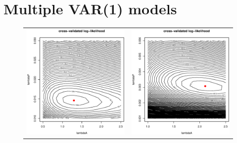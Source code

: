 \section{Multiple VAR(1) models}
\begin{figure}[h!]
\centering
\begin{tabular}{cc}
\includegraphics[scale=0.35]{Figure_9a.eps} &
\includegraphics[scale=0.35]{Figure_9b.eps}

\end{tabular}
\end{figure}
